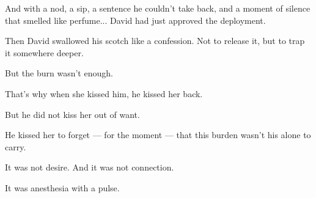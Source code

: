 And with a nod, a sip, a sentence he couldn’t take back,  
and a moment of silence that smelled like perfume...
David had just approved the deployment.

Then David swallowed his scotch like a confession.
Not to release it, but to trap it somewhere deeper.

But the burn wasn’t enough.

That's why when she kissed him, he kissed her back.

But he did not kiss her out of want.

He kissed her to forget --- for the moment --- that this burden wasn’t his alone to carry.

It was not desire. And it was not connection. 

It was anesthesia with a pulse.

\medskip

